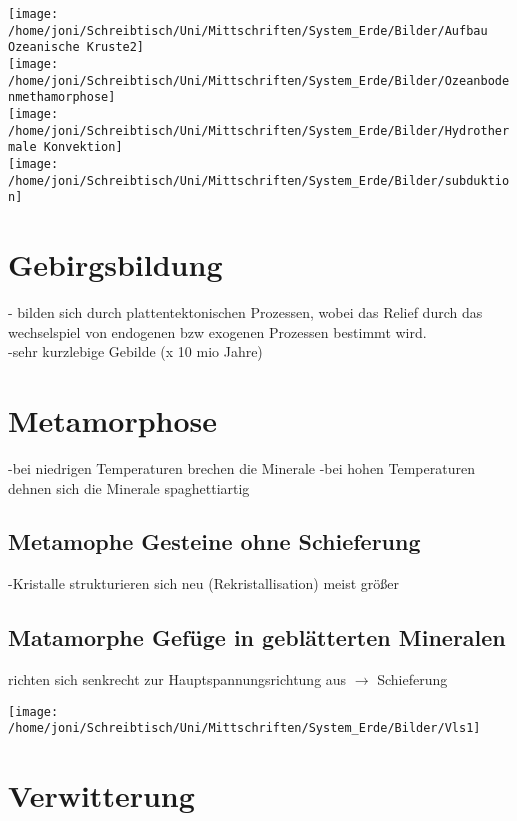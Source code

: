 \documentclass[a4,12pt]{scrreprt}
\begin{document}
\texttt{[image: /home/joni/Schreibtisch/Uni/Mittschriften/System\_Erde/Bilder/Aufbau Ozeanische Kruste2]}\\

\texttt{[image: /home/joni/Schreibtisch/Uni/Mittschriften/System\_Erde/Bilder/Ozeanbodenmethamorphose]}\\

\texttt{[image: /home/joni/Schreibtisch/Uni/Mittschriften/System\_Erde/Bilder/Hydrothermale Konvektion]}\\


\texttt{[image: /home/joni/Schreibtisch/Uni/Mittschriften/System\_Erde/Bilder/subduktion]}\\

\section{Gebirgsbildung}
- bilden sich durch plattentektonischen Prozessen, wobei das Relief durch das wechselspiel von endogenen bzw exogenen Prozessen bestimmt wird.\\
-sehr kurzlebige Gebilde (x 10 mio Jahre)\\

\section{Metamorphose}

-bei niedrigen Temperaturen brechen die Minerale
-bei hohen Temperaturen dehnen sich die Minerale spaghettiartig
\subsection{Metamophe Gesteine ohne Schieferung}
-Kristalle strukturieren sich neu (Rekristallisation) meist größer
\subsection{Matamorphe Gefüge in geblätterten Mineralen}
richten sich senkrecht zur Hauptspannungsrichtung aus $\rightarrow$ Schieferung

\texttt{[image: /home/joni/Schreibtisch/Uni/Mittschriften/System\_Erde/Bilder/Vls1]}\\


\section{Verwitterung}
\end{document}
